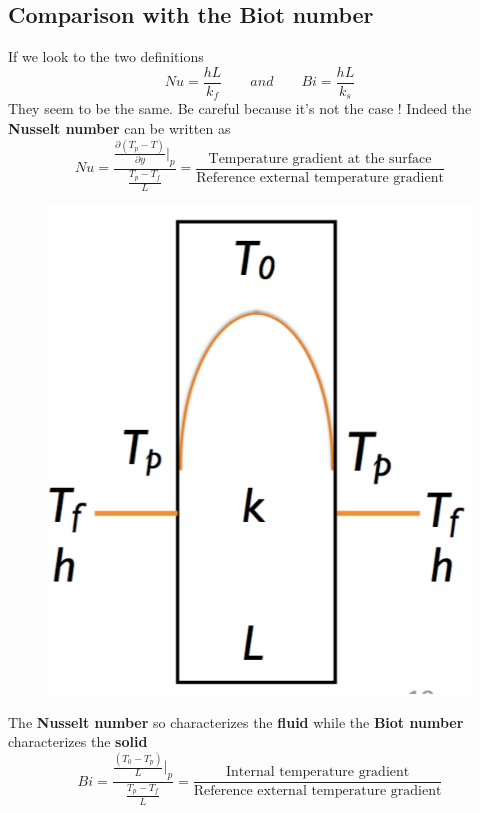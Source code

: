	\subsection{Comparison with the Biot number}
		If we look to the two definitions 
		\begin{equation}
			Nu = \frac{hL}{k_f} \qquad and \qquad Bi = \frac{hL}{k_s}
		\end{equation}
		They seem to be the same. Be careful because it's not the case ! Indeed the \textbf{Nusselt number} can be written as 
		\begin{equation}
			Nu = \frac{\frac{\partial (T_p - T)}{\partial y}|_p}{\frac{T_p-T_f}{L}} = \frac{\mbox{Temperature gradient at the surface}}{\mbox{Reference external temperature gradient}}
		\end{equation}
		
		\begin{figure}
		\vspace{-5 mm}
		\includegraphics[scale=0.25]{ch5/4}
		\end{figure}			
		The \textbf{Nusselt number} so characterizes the \textbf{fluid} while the \textbf{Biot number} characterizes the \textbf{solid}
		\begin{equation}
			Bi = \frac{\frac{(T_0 - T_p)}{L}|_p}{\frac{T_p-T_f}{L}} = \frac{\mbox{Internal temperature gradient}}{\mbox{Reference external temperature gradient}}
		\end{equation}
	
